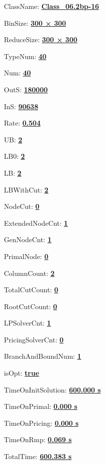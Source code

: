 \documentclass[11pt]{article}
\begin{document}
\pagestyle{empty}


ClassName: \underline{\textbf{Class_06.2bp-16}}
\par
BinSize: \underline{\textbf{300 × 300}}
\par
ReduceSize: \underline{\textbf{300 × 300}}
\par
TypeNum: \underline{\textbf{40}}
\par
Num: \underline{\textbf{40}}
\par
OutS: \underline{\textbf{180000}}
\par
InS: \underline{\textbf{90638}}
\par
Rate: \underline{\textbf{0.504}}
\par
UB: \underline{\textbf{2}}
\par
LB0: \underline{\textbf{2}}
\par
LB: \underline{\textbf{2}}
\par
LBWithCut: \underline{\textbf{2}}
\par
NodeCut: \underline{\textbf{0}}
\par
ExtendedNodeCnt: \underline{\textbf{1}}
\par
GenNodeCnt: \underline{\textbf{1}}
\par
PrimalNode: \underline{\textbf{0}}
\par
ColumnCount: \underline{\textbf{2}}
\par
TotalCutCount: \underline{\textbf{0}}
\par
RootCutCount: \underline{\textbf{0}}
\par
LPSolverCnt: \underline{\textbf{1}}
\par
PricingSolverCnt: \underline{\textbf{0}}
\par
BranchAndBoundNum: \underline{\textbf{1}}
\par
isOpt: \underline{\textbf{true}}
\par
TimeOnInitSolution: \underline{\textbf{600.000 s}}
\par
TimeOnPrimal: \underline{\textbf{0.000 s}}
\par
TimeOnPricing: \underline{\textbf{0.000 s}}
\par
TimeOnRmp: \underline{\textbf{0.069 s}}
\par
TotalTime: \underline{\textbf{600.383 s}}
\par
\newpage
\end{document}
